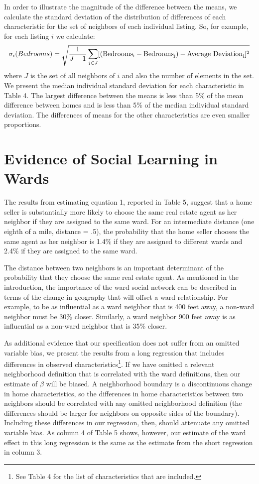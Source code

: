 \documentclass[12pt]{article}
\begin{document}
    In order to illustrate the magnitude of the difference between the means, we calculate the standard deviation of the distribution of differences
    of each characteristic for the set of neighbors of each individual listing. So, for example, for each listing $i$ we calculate:
    \[\sigma_i(Bedrooms) = \sqrt{\frac{1}{J-1}\sum_{j \in J}[(\rm{Bedrooms}_i - \rm{Bedrooms}_j) - \rm{Average \ Deviation}_i]^2}\]
    where $J$ is the set of all neighbors of $i$ and also the number of elements in the set. We present the median individual standard deviation for each characteristic in Table 4. The largest
    difference between the means is less than 5\% of the mean difference between homes and is less than 5\% of the median individual standard
    deviation. The differences of means for the other characteristics are even smaller proportions.

\section{Evidence of Social Learning in Wards}

    The results from estimating equation 1, reported in Table 5, suggest that a home seller is substantially more likely to choose the same real estate agent as
    her neighbor if they are assigned to the same ward.  For an intermediate distance (one eighth of a mile,
    distance = .5), the probability that the home seller chooses the same agent as her neighbor is 1.4\% if they are assigned to different wards
    and 2.4\% if they are assigned to the same ward.

    The distance between two neighbors is an important determinant of the probability that they choose the same real estate agent. As mentioned in the
    introduction, the importance of the ward social network can be described in terms of the change in geography that will offset a ward relationship.
    For example, to be as influential as a ward neighbor that is 400 feet away, a non-ward neighbor must be 30\% closer. Similarly, a ward neighbor
    900 feet away is as influential as a non-ward neighbor that is 35\% closer.

    As additional evidence that our specification does not suffer from an omitted variable bias, we present the results from a long regression that
    includes differences in observed characteristics\footnote{See Table 4 for the list of characteristics that are included.}. If we have omitted a
    relevant neighborhood definition that is correlated with the ward definitions, then our estimate of $\beta$ will be biased. A neighborhood
    boundary is a discontinuous change in home characteristics, so the differences in home characteristics between two neighbors should be correlated
    with any omitted neighborhood definition (the differences should be larger for neighbors on opposite sides of the boundary). Including these
    differences in our regression, then, should attenuate any omitted variable bias. As column 4 of Table 5 shows, however, our estimate of the ward
    effect in this long regression is the same as the estimate from the short regression in column 3.
\end{document}
